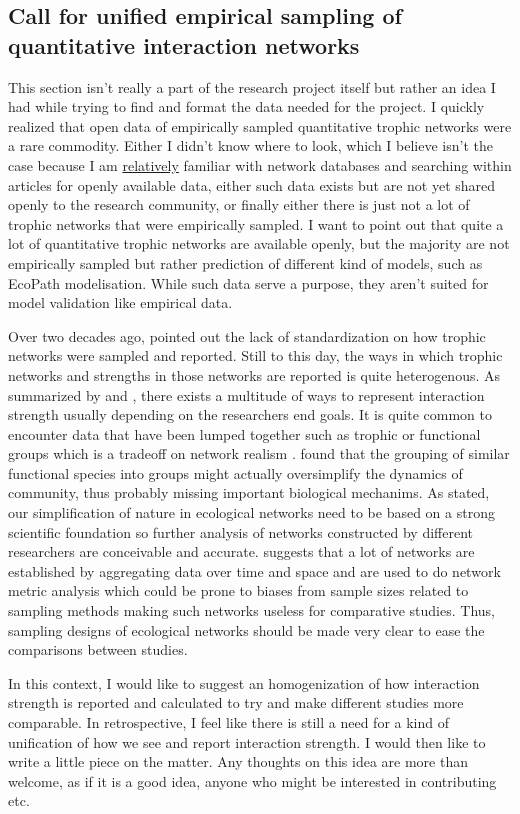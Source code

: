 \documentclass[english,12pt]{article}
\begin{document}
\subsection{Call for unified empirical sampling of quantitative interaction networks}
This section isn't really a part of the research project itself but rather an idea I had while trying to find and format the data needed for the project. I quickly realized that open data of empirically sampled quantitative trophic networks were a rare commodity. Either I didn't know where to look, which I believe isn't the case because I am \uline{relatively} familiar with network databases and searching within articles for openly available data, either such data exists but are not yet shared openly to the research community, or finally either there is just not a lot of trophic networks that were empirically sampled. I want to point out that quite a lot of quantitative trophic networks are available openly, but the majority are not empirically sampled but rather prediction of different kind of models, such as EcoPath modelisation. While such data serve a purpose, they aren't suited for model validation like empirical data.\

Over two decades ago, \cite{Cohen1993ImpFooa} pointed out the lack of standardization on how trophic networks were sampled and reported. Still to this day, the ways in which trophic networks and strengths in those networks are reported is quite heterogenous. As summarized by \cite{Berlow2004IntStr} and \cite{Laska1998TheConb}, there exists a multitude of ways to represent interaction strength usually depending on the researchers end goals. It is quite common to encounter data that have been lumped together such as trophic or functional groups which is a tradeoff on network realism \citep{Heleno2014EcoNet}. \cite{Schmitz2001EffTop} found that the grouping of similar functional species into groups might actually oversimplify the dynamics of community, thus probably missing important biological mechanims. As \cite{Heleno2014EcoNet} stated, our simplification of nature in ecological networks need to be based on a strong scientific foundation so further analysis of networks constructed by different researchers are conceivable and accurate. \cite{Wells2013SpeInt} suggests that a lot of networks are established by aggregating data over time and space and are used to do network metric analysis which could be prone to biases from sample sizes related to sampling methods making such networks useless for comparative studies. Thus, sampling designs of ecological networks should be made very clear to ease the comparisons between studies.

In this context, I would like to suggest an homogenization of how interaction strength is reported and calculated to try and make different studies more comparable.
In retrospective, I feel like there is still a need for a kind of unification of how we see and report interaction strength. I would then like to write a little piece on the matter. Any thoughts on this idea are more than welcome, as if it is a good idea, anyone who might be interested in contributing etc.

\pagebreak
\printbibliography
\end{document}
